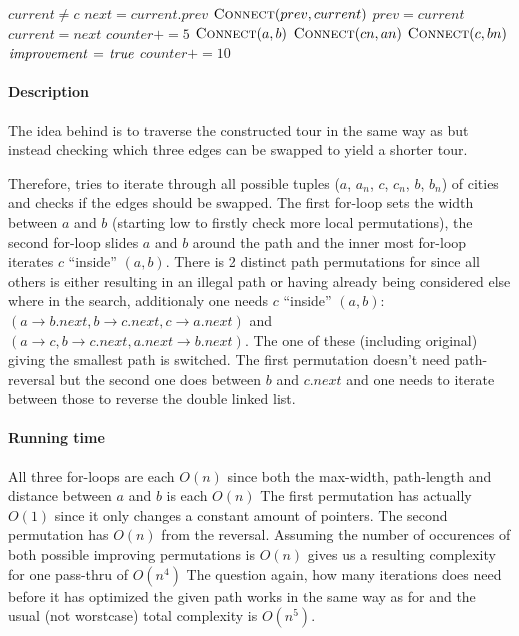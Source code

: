 \begin{codebox}
\li                                     \While $current\neq c$
\li                                         \Do
                                                $next=current.prev$
\li                                             $\textnormal{\scshape Connect}(prev,current)$
\li                                             $prev=current$
\li                                             $current=next$
\li                                             $counter+=5$
                                            \End
\li                                     $\textnormal{\scshape Connect}(a,b)$
\li                                     $\textnormal{\scshape Connect}(cn,an)$
\li                                     $\textnormal{\scshape Connect}(c,bn)$
\li                                     $\id{improvement} \gets \id{true}$
\li                                     $counter+=10$
                                    \End
                                \End
                            \End
                        \End
                \End
        \End
\end{codebox}

\paragraph{Description}
The idea behind  is to traverse the constructed tour in the same way as  but instead checking which three edges 
can be swapped to yield a shorter tour.

Therefore,  tries to iterate through all possible
tuples ($a$, $a_n$, $c$, $c_n$, $b$, $b_n$) of cities and checks if the edges should be
swapped. The first for-loop sets the width between $a$ and $b$ (starting low to firstly check more local permutations), 
the second for-loop slides $a$ and $b$ around the path and the inner most for-loop iterates $c$ ``inside'' $(a,b)$.
There is 2 distinct path permutations for  since all others is either resulting in an illegal path or having already being considered else where in the search, additionaly one needs $c$ ``inside'' $(a,b)$: 
$(a\rightarrow b.next,b\rightarrow c.next,c\rightarrow a.next)$ and $(a\rightarrow c,b\rightarrow c.next,a.next\rightarrow b.next)$.
The one of these (including original) giving the smallest path is switched.
The first permutation doesn't need path-reversal but the second one does between $b$ and $c.next$ and one needs to iterate between those to reverse the double linked list. 

\paragraph{Running time}
All three for-loops are each $O(n)$ since both the max-width, path-length and distance between $a$ and $b$ is each $O(n)$
The first permutation has actually $O(1)$ since it only changes a constant amount of pointers. The second permutation has $O(n)$ from the reversal.
Assuming the number of occurences of both possible improving  permutations is $O(n)$ gives us a resulting complexity for one pass-thru of $O(n^4)$
The question again, how many iterations does  need before it has optimized the given path works in the same way as for  and the usual (not worstcase) total complexity is $O(n^5)$.

